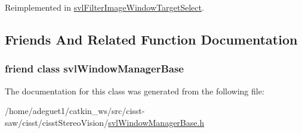 Reimplemented in \hyperlink{classsvl_filter_image_window_target_select_a055043d8450c3d19c9c20ca84e4561a3}{svl\-Filter\-Image\-Window\-Target\-Select}.



\subsection{Friends And Related Function Documentation}
\hypertarget{classsvl_window_event_handler_base_a46aa18ca3dfcb3925b69fe97f8e1c54d}{
\subsubsection[{svl\-Window\-Manager\-Base}]{\setlength{\rightskip}{0pt plus 5cm}friend class {\bf svl\-Window\-Manager\-Base}\hspace{0.3cm}{\ttfamily [friend]}}}\label{classsvl_window_event_handler_base_a46aa18ca3dfcb3925b69fe97f8e1c54d}


The documentation for this class was generated from the following file\-:\begin{DoxyCompactItemize}
\item 
/home/adeguet1/catkin\-\_\-ws/src/cisst-\/saw/cisst/cisst\-Stereo\-Vision/\hyperlink{svl_window_manager_base_8h}{svl\-Window\-Manager\-Base.\-h}\end{DoxyCompactItemize}
